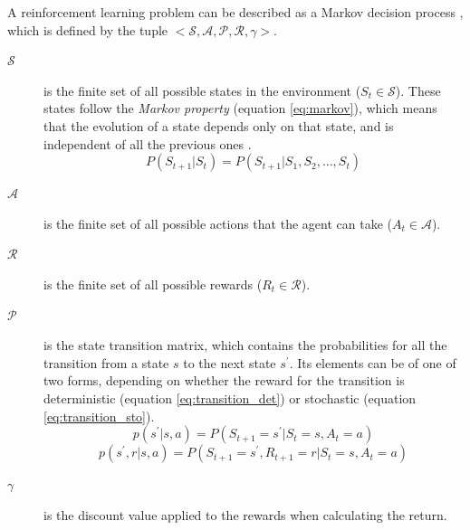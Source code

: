A reinforcement learning problem can be described as a Markov decision process \cite{Sutton:2018}, which is defined by the tuple $<\mathcal{S}, \mathcal{A},\mathcal{P},\mathcal{R},\gamma>$.

\begin{description}
    \item[$\mathcal{S}$] is the finite set of all possible states in the environment ($S_t \in \mathcal{S}$). These states follow the \textit{Markov property} (equation \ref{eq:markov}), which means that the evolution of a state depends only on that state, and is independent of all the previous ones \cite{Sutton:2018}.
    \begin{equation}
    \label{eq:markov}
        P(S_{t+1}|S_t) = P(S_{t+1}|S_1, S_2, \ldots, S_t)
    \end{equation}
    \item[$\mathcal{A}$] is the finite set of all possible actions that the agent can take ($A_t \in \mathcal{A}$).
    \item[$\mathcal{R}$] is the finite set of all possible rewards ($R_t \in \mathcal{R}$). 
    \item[$\mathcal{P}$] is the state transition matrix, which contains the probabilities for all the transition from a state $s$ to the next state $s^\prime$. Its elements can be of one of two forms, depending on whether the reward for the transition is deterministic (equation \ref{eq:transition_det}) or stochastic (equation \ref{eq:transition_sto}).
    \begin{equation}
    \label{eq:transition_det}
        p(s^\prime|s, a) = P(S_{t+1} = s^\prime|S_t = s, A_t = a)
    \end{equation}
    \begin{equation}
    \label{eq:transition_sto}
        p(s^\prime, r|s, a) = P(S_{t+1} = s^\prime, R_{t+1} = r|S_t = s, A_t = a)
    \end{equation}
    \item[$\gamma$] is the discount value applied to the rewards when calculating the return.
\end{description}



